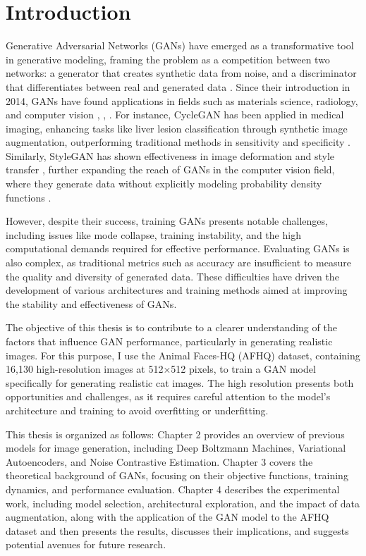 \chapter{Introduction}


Generative Adversarial Networks (GANs) have emerged as a transformative tool in generative modeling, framing the problem as a competition between two networks: a generator that creates synthetic data from noise, and a discriminator that differentiates between real and generated data \citep{10.48550/arxiv.1704.00028}. Since their introduction in 2014, GANs have found applications in fields such as materials science, radiology, and computer vision \citep{10.1002/mgea.30}, \citep{10.1016/j.media.2019.101552}, \citep{10.1016/j.artmed.2020.101938}. For instance, CycleGAN has been applied in medical imaging, enhancing tasks like liver lesion classification through synthetic image augmentation, outperforming traditional methods in sensitivity and specificity \citep{10.1016/j.neucom.2018.09.013}. Similarly, StyleGAN has shown effectiveness in image deformation and style transfer \citep{10.1109/iccv.2019.00453}, further expanding the reach of GANs in the computer vision field, where they generate data without explicitly modeling probability density functions \citep{10.1016/j.media.2019.101552}.

However, despite their success, training GANs presents notable challenges, including issues like mode collapse, training instability, and the high computational demands required for effective performance. Evaluating GANs is also complex, as traditional metrics such as accuracy are insufficient to measure the quality and diversity of generated data. These difficulties have driven the development of various architectures and training methods aimed at improving the stability and effectiveness of GANs.

The objective of this thesis is to contribute to a clearer understanding of the factors that influence GAN performance, particularly in generating realistic images. For this purpose, I use the Animal Faces-HQ (AFHQ) dataset, containing 16,130 high-resolution images at 512×512 pixels, to train a GAN model specifically for generating realistic cat images. The high resolution presents both opportunities and challenges, as it requires careful attention to the model’s architecture and training to avoid overfitting or underfitting.

This thesis is organized as follows: Chapter 2 provides an overview of previous models for image generation, including Deep Boltzmann Machines, Variational Autoencoders, and Noise Contrastive Estimation. Chapter 3 covers the theoretical background of GANs, focusing on their objective functions, training dynamics, and performance evaluation. Chapter 4 describes the experimental work, including model selection, architectural exploration, and the impact of data augmentation, along with the application of the GAN model to the AFHQ dataset and then presents the results, discusses their implications, and suggests potential avenues for future research.
